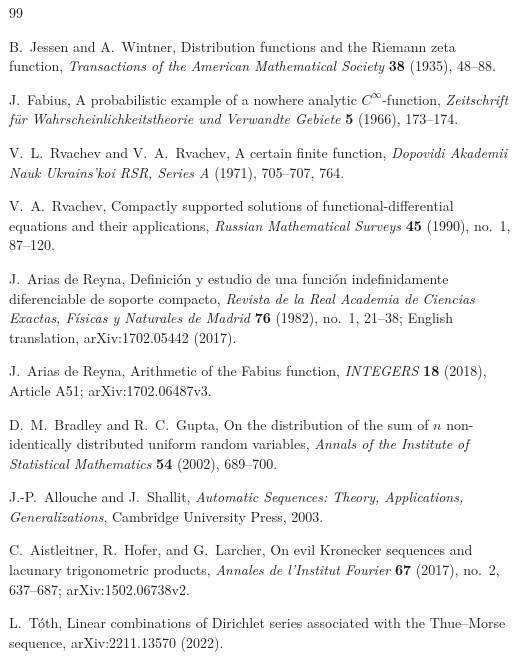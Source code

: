 \documentclass[11pt]{article}
\numberwithin{equation}{section}
\theoremstyle{definition}
\theoremstyle{remark}
\begin{document}
\begin{thebibliography}{99}

B.~Jessen and A.~Wintner,
\newblock Distribution functions and the Riemann zeta function,
\newblock \emph{Transactions of the American Mathematical Society} \textbf{38} (1935),
48--88.

J.~Fabius,
\newblock A probabilistic example of a nowhere analytic $C^\infty$-function,
\newblock \emph{Zeitschrift f\"ur Wahrscheinlichkeitstheorie und Verwandte Gebiete}
\textbf{5} (1966), 173--174.

V.~L.~Rvachev and V.~A.~Rvachev,
\newblock A certain finite function,
\newblock \emph{Dopovidi Akademii Nauk Ukrains'koi RSR, Series A} (1971), 705--707, 764.

V.~A.~Rvachev,
\newblock Compactly supported solutions of functional-differential equations and their
applications,
\newblock \emph{Russian Mathematical Surveys} \textbf{45} (1990), no.~1, 87--120.

J.~Arias de Reyna,
\newblock Definici\'on y estudio de una funci\'on indefinidamente diferenciable de soporte
compacto,
\newblock \emph{Revista de la Real Academia de Ciencias Exactas, F\'isicas y Naturales de
Madrid} \textbf{76} (1982), no.~1, 21--38; English translation, arXiv:1702.05442 (2017).

J.~Arias de Reyna,
\newblock Arithmetic of the Fabius function,
\newblock \emph{INTEGERS} \textbf{18} (2018), Article A51; arXiv:1702.06487v3.

D.~M.~Bradley and R.~C.~Gupta,
\newblock On the distribution of the sum of $n$ non-identically distributed uniform random
variables,
\newblock \emph{Annals of the Institute of Statistical Mathematics} \textbf{54} (2002),
689--700.

J.-P.~Allouche and J.~Shallit,
\newblock \emph{Automatic Sequences: Theory, Applications, Generalizations},
\newblock Cambridge University Press, 2003.

C.~Aistleitner, R.~Hofer, and G.~Larcher,
\newblock On evil Kronecker sequences and lacunary trigonometric products,
\newblock \emph{Annales de l'Institut Fourier} \textbf{67} (2017), no.~2, 637--687;
arXiv:1502.06738v2.

L.~T\'oth,
\newblock Linear combinations of Dirichlet series associated with the Thue--Morse sequence,
\newblock arXiv:2211.13570 (2022).


\end{thebibliography}
\end{document}
